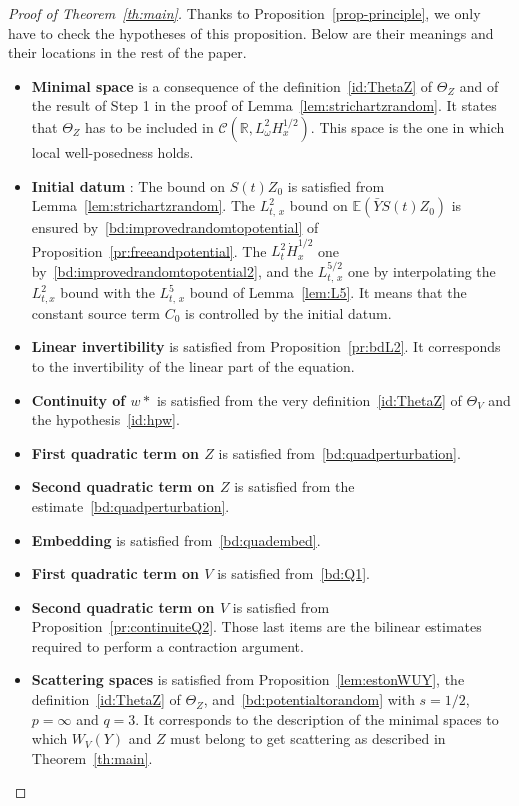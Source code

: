 \documentclass[10pt]{amsart}
\theoremstyle{definition}\newtheorem{defi}[theo]{Definition}\newtheorem{rema}[theo]{Remark}\newtheorem{exam}[theo]{Example}\newtheorem{exem}[theo]{Example}\newtheorem{nota}[theo]{Notation}
\newcommand{\R}{\mathbb{R}}
\newcommand{\E}{\mathbb{E}}
\newcommand{\mclC}{\mathcal{C}}
\begin{document}
\begin{proof}[Proof of Theorem~\ref{th:main}]
Thanks to Proposition~\ref{prop-principle}, we only have to check the hypotheses of this proposition. Below are their meanings and their locations in the rest of the paper.
\begin{itemize}
\item \textbf{Minimal space} is a consequence of the definition~\eqref{id:ThetaZ} of $\Theta_Z$ and of the result of Step 1 in the proof of Lemma~\ref{lem:strichartzrandom}. It states that $\Theta_Z$ has to be included in $\mclC(\R, L^2_\omega H^{1/2}_x)$. This space is the one in which local well-posedness holds.
\item \textbf{Initial datum} : The bound on $S(t)Z_0$ is satisfied from Lemma~\ref{lem:strichartzrandom}. The $L^2_{t,\,x}$ bound on $\E(\bar Y S(t) Z_0)$ is ensured by~\eqref{bd:improvedrandomtopotential} of Proposition~\ref{pr:freeandpotential}. The $L^2_t \dot H^{1/2}_x$ one by~\eqref{bd:improvedrandomtopotential2}, and the $L^{5/2}_{t,\,x}$ one by interpolating the $L^2_{t,x}$ bound with the $L^5_{t,\,x}$ bound of Lemma~\ref{lem:L5}. It means that the constant source term $C_0$ is controlled by the initial datum.
\item \textbf{Linear invertibility} is satisfied from Proposition~\ref{pr:bdL2}. It corresponds to the invertibility of the linear part of the equation.
\item \textbf{Continuity of $w*$} is satisfied from the very definition~\eqref{id:ThetaZ} of $\Theta_V$ and the hypothesis~\eqref{id:hpw}.
\item \textbf{First quadratic term on $Z$} is satisfied from~\eqref{bd:quadperturbation}.
\item \textbf{Second quadratic term on $Z$} is satisfied from the estimate~\eqref{bd:quadperturbation}.
\item \textbf{Embedding} is satisfied from~\eqref{bd:quadembed}.
\item \textbf{First quadratic term on $V$} is satisfied from~\eqref{bd:Q1}.
\item \textbf{Second quadratic term on $V$} is satisfied from Proposition~\ref{pr:continuiteQ2}. Those last items are the bilinear estimates required to perform a contraction argument.
\item \textbf{Scattering spaces} is satisfied from Proposition~\ref{lem:estonWUY}, the definition~\eqref{id:ThetaZ} of $\Theta_Z$, and~\eqref{bd:potentialtorandom} with $s=1/2$, $p=\infty$ and $q=3$. It corresponds to the description of the minimal spaces to which $W_V(Y)$ and $Z$ must belong to get scattering as described in Theorem~\ref{th:main}.\qedhere
\end{itemize}
\end{proof}
\end{document}
